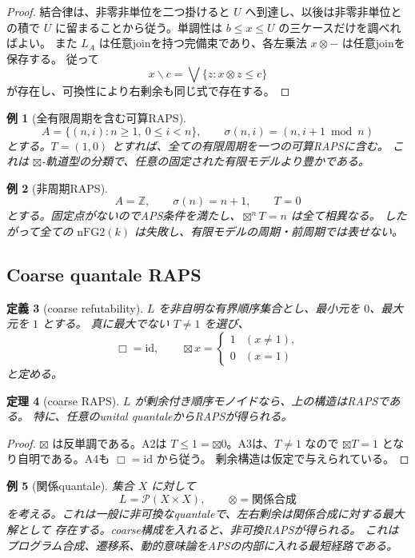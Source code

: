 \documentclass[uplatex,dvipdfmx,a4paper,10pt]{jsarticle}
\newtheorem{theorem}{定理}
\newtheorem{definition}[theorem]{定義}
\newtheorem{example}[theorem]{例}
\newcommand{\nFGtwo}{\mathrm{nFG2}}
\newcommand{\bt}{\boxtimes}
\newcommand{\resl}{\backslash}
\newcommand{\Pow}{\mathcal P}
\newcommand{\Z}{\mathbb Z}
\begin{document}
\begin{proof}
結合律は、非零非単位を二つ掛けると \(U\) へ到達し、以後は非零非単位との積で
\(U\) に留まることから従う。単調性は \(b\le x\le U\) の三ケースだけを調べればよい。
また \(L_A\) は任意joinを持つ完備束であり、各左乗法 \(x\otimes -\) は任意joinを保存する。
従って
\[
x\resl c=\bigvee\{z:x\otimes z\le c\}
\]
が存在し、可換性により右剰余も同じ式で存在する。
\end{proof}

\begin{example}[全有限周期を含む可算RAPS]
\[
A=\{(n,i):n\ge1,\ 0\le i<n\},\qquad
\sigma(n,i)=(n,i+1\bmod n)
\]
とする。\(T=(1,0)\) とすれば、全ての有限周期を一つの可算RAPSに含む。
これは \(\bt\)-軌道型の分類で、任意の固定された有限モデルより豊かである。
\end{example}

\begin{example}[非周期RAPS]
\[
A=\Z,\qquad \sigma(n)=n+1,\qquad T=0
\]
とする。固定点がないのでAPS条件を満たし、\(\bt^nT=n\) は全て相異なる。
したがって全ての \(\nFGtwo(k)\) は失敗し、有限モデルの周期・前周期では表せない。
\end{example}

\subsection{Coarse quantale RAPS}

\begin{definition}[coarse refutability]
\(L\) を非自明な有界順序集合とし、最小元を \(0\)、最大元を \(1\) とする。
真に最大でない \(T\ne1\) を選び、
\[
\Box=\mathrm{id},\qquad
\bt x=
\begin{cases}
1 & (x\ne1),\\
0 & (x=1)
\end{cases}
\]
と定める。
\end{definition}

\begin{theorem}[coarse RAPS]
\(L\) が剰余付き順序モノイドなら、上の構造はRAPSである。
特に、任意のunital quantaleからRAPSが得られる。
\end{theorem}

\begin{proof}
\(\bt\) は反単調である。A2は \(T\le1=\bt0\)。A3は、\(T\ne1\) なので
\(\bt T=1\) となり自明である。A4も \(\Box=\mathrm{id}\) から従う。
剰余構造は仮定で与えられている。
\end{proof}

\begin{example}[関係quantale]
集合 \(X\) に対して
\[
L=\Pow(X\times X),\qquad \otimes=\text{関係合成}
\]
を考える。これは一般に非可換なquantaleで、左右剰余は関係合成に対する最大解として
存在する。coarse構成を入れると、非可換RAPSが得られる。
これはプログラム合成、遷移系、動的意味論をAPSの内部に入れる最短経路である。
\end{example}
\end{document}
